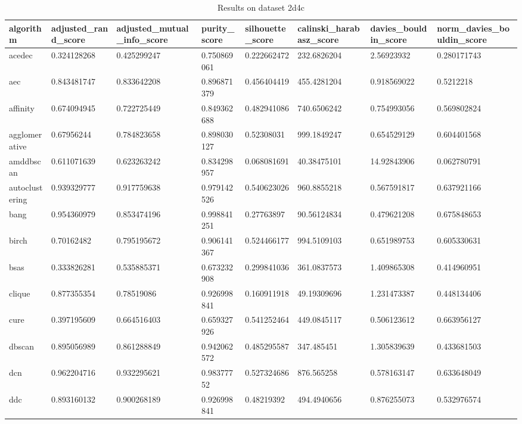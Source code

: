 \begin{table}[H]
\centering
\caption{Results on dataset 2d4c}
\label{tab:params:2d4c}
\begin{tabular}{|l|l|l|l|l|l|l|l|}
\hline
algorithm & adjusted\_rand\_score & adjusted\_mutual\_info\_score & purity\_score & silhouette\_score & calinski\_harabasz\_score & davies\_bouldin\_score & norm\_davies\_bouldin\_score \\
\hline
acedec & 0.324128268 & 0.425299247 & 0.750869061 & 0.222662472 & 232.6826204 & 2.56923932 & 0.280171743 \\
\hline
aec & 0.843481747 & 0.833642208 & 0.896871379 & 0.456404419 & 455.4281204 & 0.918569022 & 0.5212218 \\
\hline
affinity & 0.674094945 & 0.722725449 & 0.849362688 & 0.482941086 & 740.6506242 & 0.754993056 & 0.569802824 \\
\hline
agglomerative & 0.67956244 & 0.784823658 & 0.898030127 & 0.52308031 & 999.1849247 & 0.654529129 & 0.604401568 \\
\hline
amddbscan & 0.611071639 & 0.623263242 & 0.834298957 & 0.068081691 & 40.38475101 & 14.92843906 & 0.062780791 \\
\hline
autoclustering & 0.939329777 & 0.917759638 & 0.979142526 & 0.540623026 & 960.8855218 & 0.567591817 & 0.637921166 \\
\hline
bang & 0.954360979 & 0.853474196 & 0.998841251 & 0.27763897 & 90.56124834 & 0.479621208 & 0.675848653 \\
\hline
birch & 0.70162482 & 0.795195672 & 0.906141367 & 0.524466177 & 994.5109103 & 0.651989753 & 0.605330631 \\
\hline
bsas & 0.333826281 & 0.535885371 & 0.673232908 & 0.299841036 & 361.0837573 & 1.409865308 & 0.414960951 \\
\hline
clique & 0.877355354 & 0.78519086 & 0.926998841 & 0.160911918 & 49.19309696 & 1.231473387 & 0.448134406 \\
\hline
cure & 0.397195609 & 0.664516403 & 0.659327926 & 0.541252464 & 449.0845117 & 0.506123612 & 0.663956127 \\
\hline
dbscan & 0.895056989 & 0.861288849 & 0.942062572 & 0.485295587 & 347.485451 & 1.305839639 & 0.433681503 \\
\hline
dcn & 0.962204716 & 0.932295621 & 0.98377752 & 0.527324686 & 876.565258 & 0.578163147 & 0.633648049 \\
\hline
ddc & 0.893160132 & 0.900268189 & 0.926998841 & 0.48219392 & 494.4940656 & 0.876255073 & 0.532976574 \\
\hline

\end{tabular}
\end{table}
